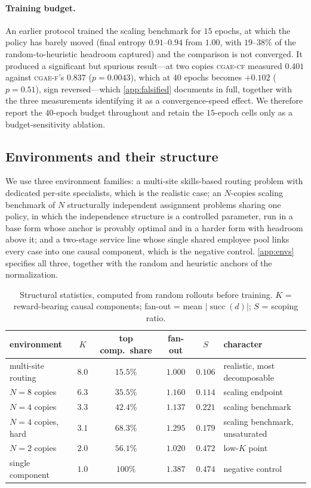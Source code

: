 \documentclass[review,authoryear,3p,times]{elsarticle}
\newcommand{\cflow}{\textsc{cgae-cf}}          %
\newcommand{\cflowraw}{\textsc{cgae-f}}        %
\newcommand{\suc}{\operatorname{succ}}
\begin{document}
\paragraph{Training budget.}
An earlier protocol trained the scaling benchmark for $15$ epochs, at which the
policy has barely moved (final entropy $0.91$--$0.94$ from $1.00$, with
$19$--$38\%$ of the random-to-heuristic headroom captured) and the comparison is
not converged. It produced a significant but spurious result---at two copies
\cflow{} measured $0.401$ against \cflowraw's $0.837$ ($p=0.0043$), which at
$40$ epochs becomes $+0.102$ ($p=0.51$), sign reversed---which
\ref{app:falsified} documents in full, together with the three
measurements identifying it as a convergence-speed effect. We therefore report
the $40$-epoch budget throughout and retain the $15$-epoch cells only as a
budget-sensitivity ablation.

\subsection{Environments and their structure}

We use three environment families: a multi-site skills-based routing problem
with dedicated per-site specialists, which is the realistic case; an
$N$-copies scaling benchmark of $N$ structurally independent assignment
problems sharing one policy, in which the independence structure is a
controlled parameter, run in a base form whose anchor is provably optimal and
in a harder form with headroom above it; and a two-stage service line whose single shared employee
pool links every case into one causal component, which is the negative control.
\ref{app:envs} specifies all three, together with the random and
heuristic anchors of the normalization.

\begin{table}[tbp]
\centering
\caption{Structural statistics, computed from random rollouts before training.
$K$ = reward-bearing causal components; fan-out = mean $|\suc(d)|$;
$S$ = scoping ratio.}
\label{tab:envs}
\begin{tabular}{lccccl}
\toprule
environment & $K$ & top comp.\ share & fan-out & $S$ & character \\
\midrule
multi-site routing & $8.0$ & $15.5\%$ & $\mathbf{1.000}$ & $0.106$ & realistic, most decomposable \\
$N=8$ copies       & $6.3$ & $35.5\%$ & $1.160$ & $0.114$ & scaling endpoint \\
$N=4$ copies       & $3.3$ & $42.4\%$ & $1.137$ & $0.221$ & scaling benchmark \\
$N=4$ copies, hard & $3.1$ & $68.3\%$ & $1.295$ & $0.179$ & scaling benchmark, unsaturated \\
$N=2$ copies       & $2.0$ & $56.1\%$ & $1.020$ & $0.472$ & low-$K$ point \\
single component   & $1.0$ & $100\%$  & $1.387$ & $0.474$ & negative control \\
\bottomrule
\end{tabular}
\end{table}
\end{document}
